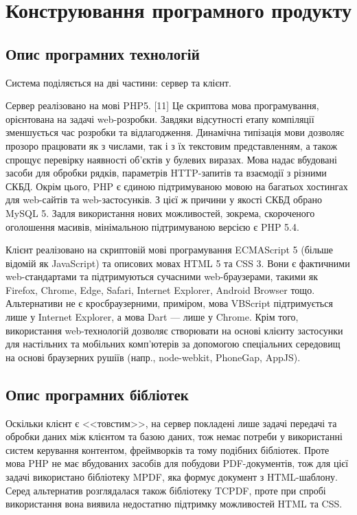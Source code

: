 \newpage
\section{Конструювання програмного продукту}
\subsection{Опис програмних технологій}
\bigbreak
Система поділяється на дві частини: сервер та клієнт.

Сервер реалізовано на мові PHP5. [11] Це скриптова мова програмування, орієнтована на задачі web-розробки. Завдяки відсутності етапу компіляції зменшується час розробки та відлагодження. Динамічна типізація мови дозволяє прозоро працювати як з числами, так і з їх текстовим представленням, а також спрощує перевірку наявності об'єктів у булевих виразах. Мова надає вбудовані засоби для обробки рядків, параметрів HTTP-запитів та взаємодії з різними СКБД. Окрім цього, PHP є єдиною підтримуваною мовою на багатьох хостингах для web-сайтів та web-застосунків. З цієї ж причини у якості СКБД обрано MySQL 5. Задля використання нових можливостей, зокрема, скороченого оголошення масивів, мінімальною підтримуваною версією є PHP 5.4.

Клієнт реалізовано на скриптовій мові програмування ECMAScript 5 (більше відомій як JavaScript) та описових мовах HTML 5 та CSS 3. Вони є фактичними web-стандартами та підтримуються сучасними web-браузерами, такими як Firefox, Chrome, Edge, Safari, Internet Explorer, Android Browser тощо. Альтернативи не є кросбраузерними, приміром, мова VBScript підтримується лише у Internet Explorer, а мова Dart --- лише у Chrome. Крім того, використання web-технологій дозволяє створювати на основі клієнту застосунки для настільних та мобільних комп'ютерів за допомогою спеціальних середовищ на основі браузерних рушіїв (напр., node-webkit, PhoneGap, AppJS).
\bigbreak
\subsection{Опис програмних бібліотек}
\bigbreak
Оскільки клієнт є <<товстим>>, на сервер покладені лише задачі передачі та обробки даних між клієнтом та базою даних, тож немає потреби у використанні систем керування контентом, фреймворків та тому подібних бібліотек. Проте мова PHP не має вбудованих засобів для побудови PDF-документів, тож для цієї задачі використано бібліотеку MPDF, яка формує документ з HTML-шаблону. Серед альтернатив розглядалася також бібліотеку TCPDF, проте при спробі використання вона виявила недостатню підтримку можливостей HTML та CSS.

